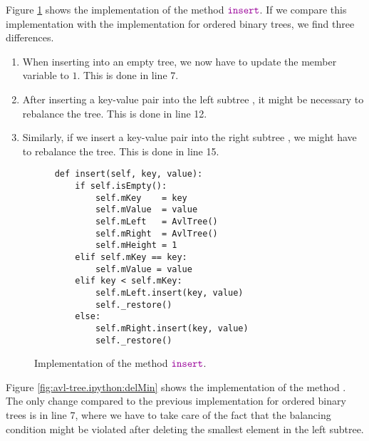 Figure \ref{fig:avl-tree.ipython:insert} shows the implementation of the method $\mytt{insert}$.
If we compare this implementation with the implementation for ordered binary trees, we find three
differences.
\begin{enumerate}
\item When inserting into an empty tree, we now have to update the member variable 
      to $1$.  This is done in line 7.
\item After inserting a key-value pair into the left subtree , it might be necessary to 
      rebalance the tree.  This is done in line 12.
\item Similarly, if we insert a key-value pair into the right subtree , we might have to rebalance 
      the tree.  This is done in line 15.
\end{enumerate}

\begin{figure}[!ht]
\centering
\begin{verbatim}
    def insert(self, key, value):
        if self.isEmpty():
            self.mKey    = key
            self.mValue  = value
            self.mLeft   = AvlTree()
            self.mRight  = AvlTree()
            self.mHeight = 1
        elif self.mKey == key:
            self.mValue = value
        elif key < self.mKey:
            self.mLeft.insert(key, value)
            self._restore()
        else:
            self.mRight.insert(key, value)
            self._restore()
\end{verbatim}
\vspace*{-0.3cm}
\caption{Implementation of the method $\mytt{insert}$.}
\label{fig:avl-tree.ipython:insert}
\end{figure}

Figure \ref{fig:avl-tree.ipython:delMin} shows the implementation of the method .
The only change compared to the previous implementation for ordered binary trees is in line 7, where
we have to take care of the fact that the balancing condition might be violated after deleting the
smallest element in the left subtree.

